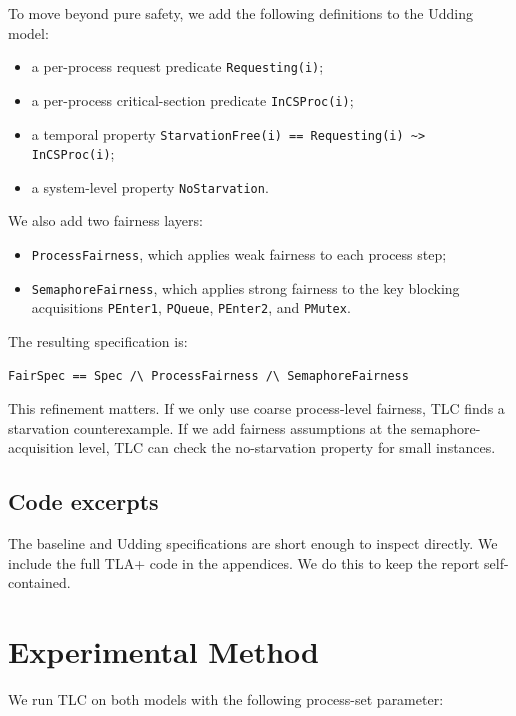 \documentclass[11pt]{article}
\begin{document}
To move beyond pure safety, we add the following definitions to the Udding model:

\begin{itemize}
  \item a per-process request predicate \texttt{Requesting(i)};
  \item a per-process critical-section predicate \texttt{InCSProc(i)};
  \item a temporal property \texttt{StarvationFree(i) == Requesting(i) \textasciitilde> InCSProc(i)};
  \item a system-level property \texttt{NoStarvation}.
\end{itemize}

We also add two fairness layers:

\begin{itemize}
  \item \texttt{ProcessFairness}, which applies weak fairness to each process step;
  \item \texttt{SemaphoreFairness}, which applies strong fairness to the key blocking acquisitions \texttt{PEnter1}, \texttt{PQueue}, \texttt{PEnter2}, and \texttt{PMutex}.
\end{itemize}

The resulting specification is:

\begin{lstlisting}[language=TLA]
FairSpec == Spec /\ ProcessFairness /\ SemaphoreFairness
\end{lstlisting}

This refinement matters. If we only use coarse process-level fairness, TLC finds a starvation counterexample. If we add fairness assumptions at the semaphore-acquisition level, TLC can check the no-starvation property for small instances.

\subsection{Code excerpts}

The baseline and Udding specifications are short enough to inspect directly. We include the full TLA+ code in the appendices. We do this to keep the report self-contained.

\section{Experimental Method}

We run TLC on both models with the following process-set parameter:
\end{document}
